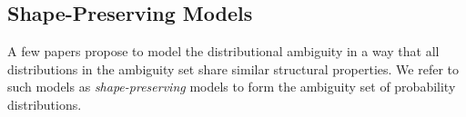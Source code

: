\documentclass[final,onefignum,onetabnum]{class}
\begin{document}
\subsection{Shape-Preserving Models}
\label{sec: rev.shape}

A few papers propose to model the distributional ambiguity in a way that all distributions in the ambiguity set share similar structural properties. 
We refer to such models  as {\it shape-preserving} models to form the ambiguity set of probability distributions.  
\end{document}
